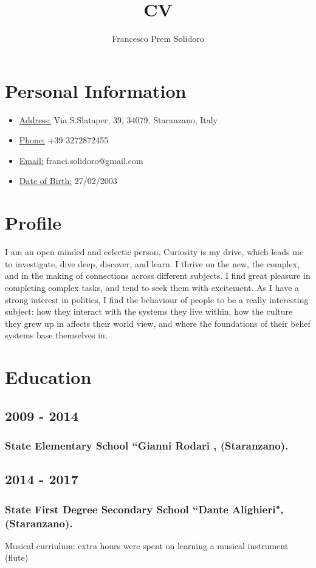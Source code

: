 \documentclass[12pt]{article}
\author{Francesco Prem Solidoro}
\title{CV}
\renewcommand{\maketitle}{
\begin{center}
{\huge\bfseries
\theauthor}
\end{center}
}
\begin{document}
\maketitle
\section{Personal Information}
\begin{itemize}
	\item \underline {Address:} Via S.Slataper, 39, 34079, Staranzano, Italy
	\item \underline {Phone:} +39 3272872455
	\item \underline{Email:} franci.solidoro@gmail.com
	\item \underline{Date of Birth:} 27/02/2003
\end{itemize}
\section{Profile}
I am an open minded and eclectic person. Curiosity is my drive, which leads me to investigate, dive deep, discover, and learn. I thrive on the new, the complex, and in the making of connections across
different subjects. I find great pleasure in completing complex tasks, and tend to seek them with excitement. As I have a strong interest in politics, I find the behaviour of people to be a really
interesting subject: how they interact with the systems they live within, how the culture they grew up in affects their world view, and where the foundations of their belief systems base themselves in.
\section{Education}
\subsection{2009 - 2014}
\subsubsection{State Elementary School ``Gianni Rodari , (Staranzano).}
\subsection{2014 - 2017}
\subsubsection{State First Degree Secondary School ``Dante Alighieri", (Staranzano).}
Musical curriulum: extra hours were spent on learning a musical instrument (flute)
\end{document}
